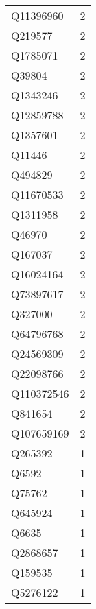 \begin{tabular}{lr}
   Q11396960 &                             2 \\
     Q219577 &                             2 \\
    Q1785071 &                             2 \\
      Q39804 &                             2 \\
    Q1343246 &                             2 \\
   Q12859788 &                             2 \\
    Q1357601 &                             2 \\
      Q11446 &                             2 \\
     Q494829 &                             2 \\
   Q11670533 &                             2 \\
    Q1311958 &                             2 \\
      Q46970 &                             2 \\
     Q167037 &                             2 \\
   Q16024164 &                             2 \\
   Q73897617 &                             2 \\
     Q327000 &                             2 \\
   Q64796768 &                             2 \\
   Q24569309 &                             2 \\
   Q22098766 &                             2 \\
  Q110372546 &                             2 \\
     Q841654 &                             2 \\
  Q107659169 &                             2 \\
     Q265392 &                             1 \\
       Q6592 &                             1 \\
      Q75762 &                             1 \\
     Q645924 &                             1 \\
       Q6635 &                             1 \\
    Q2868657 &                             1 \\
     Q159535 &                             1 \\
    Q5276122 &                             1 \\

\end{tabular}
